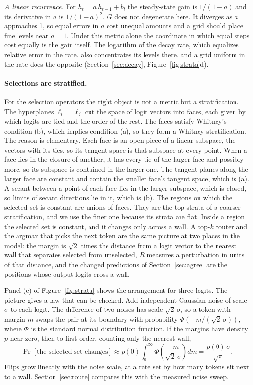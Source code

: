 \documentclass[10pt]{article}
\begin{document}
\emph{A linear recurrence.} For $h_t = a\,h_{t-1} + b_t$ the steady-state gain is $1/(1-a)$ and
its derivative in $a$ is $1/(1-a)^2$. $G$ does not degenerate here. It diverges as $a$ approaches
1, so equal errors in $a$ cost unequal amounts and a grid should place fine levels near $a=1$.
Under this metric alone the coordinate in which equal steps cost equally is the gain itself.
The logarithm of the decay rate, which equalizes relative error in the rate, also concentrates
its levels there, and a grid uniform in the rate does the opposite (Section~\ref{sec:decay},
Figure~\ref{fig:strata}d).

\paragraph{Selections are stratified.} For the selection operators the right object is not a
metric but a stratification. The hyperplanes $\ell_i = \ell_j$ cut the space of logit vectors
into faces, each given by which logits are tied and the order of the rest. The faces satisfy
Whitney's condition (b), which implies condition (a), so they form a Whitney stratification. The reason
is elementary. Each face is an open piece of a linear subspace, the vectors with its ties, so its
tangent space is that subspace at every point. When a face lies in the closure of another, it has
every tie of the larger face and possibly more, so its subspace is contained in the larger one.
The tangent planes along the larger face are constant and contain the smaller face's tangent
space, which is (a). A secant between a point of each face lies in the larger subspace, which is
closed, so limits of secant directions lie in it, which is (b). The regions on which the selected
set is constant are unions of faces. They are the top strata of a coarser stratification, and we
use the finer one because its strata are flat. Inside a region the selected set
is constant, and it changes only across a wall. A top-$k$ router and the argmax that picks the
next token are the same picture at two places in the model: the margin is $\sqrt2$ times the distance from a
logit vector to the nearest wall that separates selected from unselected, $R$ measures a
perturbation in units of that distance, and the changed predictions of Section~\ref{sec:agree}
are the positions whose output logits cross a wall.

Panel (c) of Figure~\ref{fig:strata} shows the arrangement for three logits. The picture gives a law that can
be checked. Add independent Gaussian noise of scale $\sigma$ to
each logit. The difference of two noises has scale $\sqrt2\,\sigma$, so a token with margin $m$
swaps the pair at its boundary with probability $\Phi(-m/(\sqrt2\,\sigma))$, where $\Phi$ is the
standard normal distribution function. If the margins have density $p$ near zero, then to first
order, counting only the nearest wall,
\begin{equation}
\Pr[\text{the selected set changes}] \approx p(0)\int_0^\infty \Phi\!\left(\frac{-m}{\sqrt2\,\sigma}\right)dm
= \frac{p(0)\,\sigma}{\sqrt\pi}.
\label{eq:tube}
\end{equation}
Flips grow linearly with the noise scale, at a rate set by how many tokens sit next to a wall.
Section~\ref{sec:route} compares this with the measured noise sweep.
\end{document}
